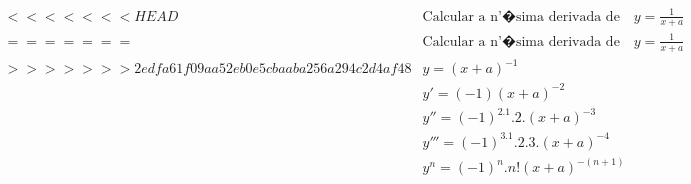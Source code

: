 \begin{ex}
\begin{align}
<<<<<<< HEAD
&\text{Calcular a n'�sima derivada de}\quad y=\frac{1}{x+a}\nonumber\\
=======
&\text{Calcular a n'�sima derivada de}\quad y=\frac{1}{x+a}\nonumber\\
>>>>>>> 2edfa61f09aa52eb0e5cbaaba256a294c2d4af48
&y=(x+a)^{-1}\nonumber\\
&y'=(-1)(x+a)^{-2}\nonumber\\
&y''=(-1)^2.1.2.(x+a)^{-3}\nonumber\\
&y'''=(-1)^3.1.2.3.(x+a)^{-4}\nonumber\\
&y^{n}=(-1)^{n}.n!(x+a)^{-(n+1)}\nonumber
\end{align}
\end{ex}
